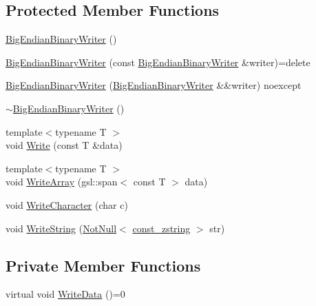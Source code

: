 \subsection*{Protected Member Functions}
\begin{DoxyCompactItemize}
\item 
\mbox{\hyperlink{classmage_1_1_big_endian_binary_writer_ac0917b684913834577d4850269a6c09a}{Big\+Endian\+Binary\+Writer}} ()
\item 
\mbox{\hyperlink{classmage_1_1_big_endian_binary_writer_aafe65752342b2740e7293878ae469d9f}{Big\+Endian\+Binary\+Writer}} (const \mbox{\hyperlink{classmage_1_1_big_endian_binary_writer}{Big\+Endian\+Binary\+Writer}} \&writer)=delete
\item 
\mbox{\hyperlink{classmage_1_1_big_endian_binary_writer_aaf2dcf536afefc7b0ca8b0752024311d}{Big\+Endian\+Binary\+Writer}} (\mbox{\hyperlink{classmage_1_1_big_endian_binary_writer}{Big\+Endian\+Binary\+Writer}} \&\&writer) noexcept
\item 
\mbox{\hyperlink{classmage_1_1_big_endian_binary_writer_ab717bcbfc15ba4a1cb25eeb564e120b8}{$\sim$\+Big\+Endian\+Binary\+Writer}} ()
\item 
{\footnotesize template$<$typename T $>$ }\\void \mbox{\hyperlink{classmage_1_1_big_endian_binary_writer_ae8bab2d7022672e1d30991c1288d981c}{Write}} (const T \&data)
\item 
{\footnotesize template$<$typename T $>$ }\\void \mbox{\hyperlink{classmage_1_1_big_endian_binary_writer_a7c82860ea3eed12777207cd00436b6c3}{Write\+Array}} (gsl\+::span$<$ const T $>$ data)
\item 
void \mbox{\hyperlink{classmage_1_1_big_endian_binary_writer_a869eff3f6e0666406bd5470af3e02096}{Write\+Character}} (char c)
\item 
void \mbox{\hyperlink{classmage_1_1_big_endian_binary_writer_acf065a2e7462c9e6cf46849bd2c9d2e7}{Write\+String}} (\mbox{\hyperlink{namespacemage_a8769f9d670d6b585ea306cb1062af94b}{Not\+Null}}$<$ \mbox{\hyperlink{namespacemage_abfd9206dc607ceb5d13ec68bf075a5c0}{const\+\_\+zstring}} $>$ str)
\end{DoxyCompactItemize}
\subsection*{Private Member Functions}
\begin{DoxyCompactItemize}
\item 
virtual void \mbox{\hyperlink{classmage_1_1_big_endian_binary_writer_a719581274b1b185ef05687183f7ded25}{Write\+Data}} ()=0
\end{DoxyCompactItemize}
